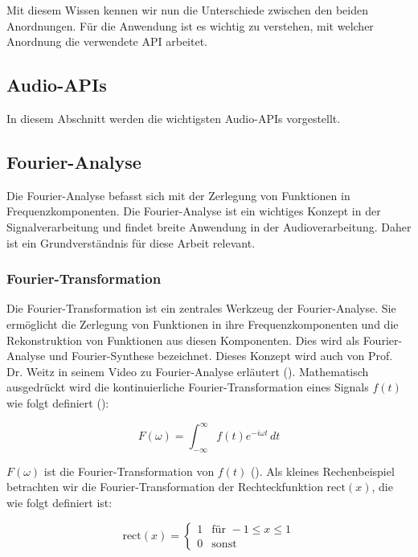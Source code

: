 \documentclass[11pt,a4paper]{article}
\begin{document}
\noindent
Mit diesem Wissen kennen wir nun die Unterschiede zwischen den beiden Anordnungen. Für die 
Anwendung ist es wichtig zu verstehen, mit welcher Anordnung die verwendete API arbeitet.

\subsection{Audio-APIs}
In diesem Abschnitt werden die wichtigsten Audio-APIs vorgestellt.



\subsection{Fourier-Analyse}
Die Fourier-Analyse befasst sich mit der Zerlegung von Funktionen in Frequenzkomponenten. Die 
Fourier-Analyse ist ein wichtiges Konzept in der Signalverarbeitung und findet breite Anwendung 
in der Audioverarbeitung. Daher ist ein Grundverständnis für diese Arbeit relevant. 

\subsubsection{Fourier-Transformation}
Die Fourier-Transformation ist ein zentrales Werkzeug der Fourier-Analyse. Sie ermöglicht die 
Zerlegung von Funktionen in ihre Frequenzkomponenten und die Rekonstruktion von Funktionen aus 
diesen Komponenten. Dies wird als Fourier-Analyse und Fourier-Synthese bezeichnet. Dieses Konzept 
wird auch von Prof. Dr. Weitz in seinem Video zu Fourier-Analyse erläutert 
(\cite[2:20]{weitz2023fourier}). Mathematisch ausgedrückt wird die kontinuierliche 
Fourier-Transformation eines Signals \( f(t) \) wie folgt definiert 
(\cite[Chapter~5]{hansen2014fourier}): 

\begin{equation*}
F(\omega) = \int_{-\infty}^{\infty} f(t) e^{-i \omega t} \, dt
\label{eq:fourier_transform}
\end{equation*}

\noindent
\(F(\omega)\) ist die Fourier-Transformation von \(f(t)\) 
(\cite[49:27]{weitz2023fourier}). Als kleines Rechenbeispiel betrachten wir die 
Fourier-Transformation der Rechteckfunktion \( \text{rect}(x) \), die wie folgt definiert ist:

\[
\text{rect}(x) = 
\begin{cases} 
1 & \text{für } -1 \leq x \leq 1 \\
0 & \text{sonst}
\end{cases}
\]
\end{document}
